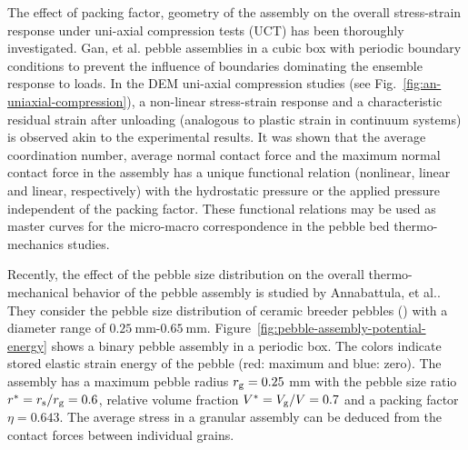 The effect of packing factor, geometry of the assembly on the overall stress-strain response under uni-axial compression tests (UCT) has been thoroughly investigated.\cite{Gan:2010uq} Gan, et al. pebble assemblies in a cubic box with periodic boundary conditions to prevent the influence of boundaries dominating the ensemble response to loads.\cite{Gilabert2007} In the DEM uni-axial compression studies (see Fig.~\ref{fig:an-uniaxial-compression}), a non-linear stress-strain response and a characteristic residual strain after unloading (analogous to plastic strain in continuum systems) is observed akin to the experimental results.\cite{Reimann:2000tw} It was shown that the average coordination number, average normal contact force and the maximum normal contact force in the assembly has a unique functional relation (nonlinear, linear and linear, respectively) with the hydrostatic pressure or the applied pressure independent of the packing factor.\cite{Gan:2010uq,An20071393} These functional relations may be used as master curves for the micro-macro correspondence in the pebble bed thermo-mechanics studies.

Recently, the effect of the pebble size distribution on the overall thermo-mechanical behavior of the pebble assembly is studied by Annabattula, et al.\cite{Annabattula2011}. They consider the pebble size distribution of ceramic breeder pebbles (\lis) with a diameter range of $0.25\ \mathrm{mm}$-$0.65\ \mathrm{mm}$. Figure~\ref{fig:pebble-assembly-potential-energy} shows a binary pebble assembly in a periodic box. The colors indicate stored elastic strain energy of the pebble (red: maximum and blue: zero). The assembly has a maximum pebble radius $r_{\mathrm{g}}=0.25$ mm with the pebble size ratio $r^{*}=r_{\mathrm{s}}/r_{\mathrm{g}}=0.6$, relative volume fraction $V^{*}=V_{\mathrm{g}}/V=0.7$ and a packing factor $\eta=0.643$. The average stress in a granular assembly can be deduced from the contact forces between individual grains.


